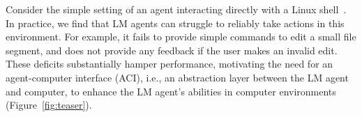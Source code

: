 



Consider the simple setting of an agent interacting directly with a Linux shell~\citep{yang2023intercode}.
In practice, we find that LM agents can struggle to reliably take actions in this environment.
For example, it fails to provide simple commands to edit a small file segment, and does not provide any feedback if the user makes an invalid edit.
These deficits substantially hamper performance, motivating the need for an agent-computer interface (ACI), i.e., an abstraction layer between the LM agent and computer, to enhance the LM agent's abilities in computer environments (Figure~\ref{fig:teaser}).

